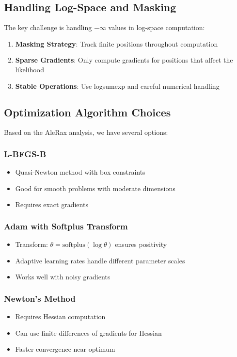 \documentclass[11pt]{article}
\theoremstyle{definition}
\begin{document}
\subsection{Handling Log-Space and Masking}

The key challenge is handling $-\infty$ values in log-space computation:

\begin{enumerate}
    \item \textbf{Masking Strategy}: Track finite positions throughout computation
    \item \textbf{Sparse Gradients}: Only compute gradients for positions that affect the likelihood
    \item \textbf{Stable Operations}: Use logsumexp and careful numerical handling
\end{enumerate}

\subsection{Optimization Algorithm Choices}

Based on the AleRax analysis, we have several options:

\subsubsection{L-BFGS-B}
\begin{itemize}
    \item Quasi-Newton method with box constraints
    \item Good for smooth problems with moderate dimensions
    \item Requires exact gradients
\end{itemize}

\subsubsection{Adam with Softplus Transform}
\begin{itemize}
    \item Transform: $\theta = \text{softplus}(\log\theta)$ ensures positivity
    \item Adaptive learning rates handle different parameter scales
    \item Works well with noisy gradients
\end{itemize}

\subsubsection{Newton's Method}
\begin{itemize}
    \item Requires Hessian computation
    \item Can use finite differences of gradients for Hessian
    \item Faster convergence near optimum
\end{itemize}
\end{document}
